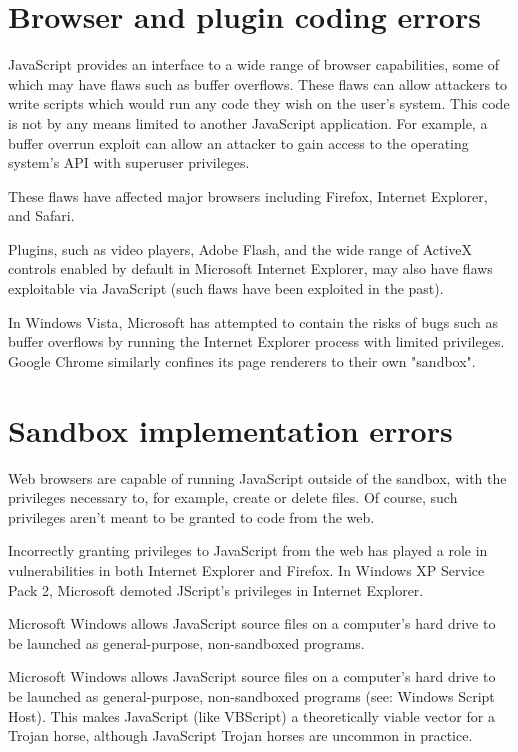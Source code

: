 \section{Browser and plugin coding errors}

JavaScript provides an interface to a wide range of browser capabilities, some of which may have flaws such as buffer overflows. These flaws can allow attackers to write scripts which would run any code they wish on the user's system. This code is not by any means limited to another JavaScript application. For example, a buffer overrun exploit can allow an attacker to gain access to the operating system's API with superuser privileges.


These flaws have affected major browsers including Firefox, Internet Explorer, and Safari.

Plugins, such as video players, Adobe Flash, and the wide range of ActiveX controls enabled by default in Microsoft Internet Explorer, may also have flaws exploitable via JavaScript (such flaws have been exploited in the past).

In Windows Vista, Microsoft has attempted to contain the risks of bugs such as buffer overflows by running the Internet Explorer process with limited privileges. Google Chrome similarly confines its page renderers to their own "sandbox".


\section{Sandbox implementation errors}

Web browsers are capable of running JavaScript outside of the sandbox, with the privileges necessary to, for example, create or delete files. Of course, such privileges aren't meant to be granted to code from the web.


Incorrectly granting privileges to JavaScript from the web has played a role in vulnerabilities in both Internet Explorer and Firefox. In Windows XP Service Pack 2, Microsoft demoted JScript's privileges in Internet Explorer.


Microsoft Windows allows JavaScript source files on a computer's hard drive to be launched as general-purpose, non-sandboxed programs.

Microsoft Windows allows JavaScript source files on a computer's hard drive to be launched as general-purpose, non-sandboxed programs (see: Windows Script Host). This makes JavaScript (like VBScript) a theoretically viable vector for a Trojan horse, although JavaScript Trojan horses are uncommon in practice.



